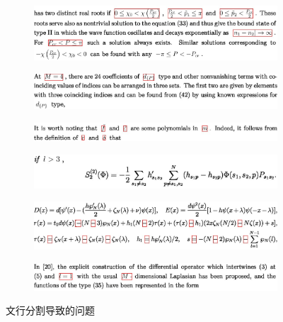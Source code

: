 \begin{figure}[hp]
    \centering
    \begin{subfigure}[b]{\linewidth}
    \centering
    \includegraphics[scale=0.3]{eps/a11.eps}
    \caption{\label{fig:fig1}}
    \end{subfigure}

    \begin{subfigure}[b]{\linewidth}
    \centering
    \includegraphics[scale=0.3]{eps/a12.eps}
    \caption{\label{fig:fig2}}
    \end{subfigure}

    \begin{subfigure}[b]{\linewidth}
    \centering   
    \includegraphics[scale=0.3]{eps/a13.eps}
    \caption{\label{fig:fig3}}
    \end{subfigure}

    \begin{subfigure}[b]{\linewidth}
    \centering 
    \includegraphics[scale=0.3]{eps/a14.eps}
    \caption{\label{fig:fig4}}
    \end{subfigure}

    \begin{subfigure}[b]{\linewidth}
    \centering 
    \includegraphics[scale=0.3]{eps/a15.eps}
    \caption{\label{fig:fig5}}
    \end{subfigure}

    \begin{subfigure}[b]{\linewidth}
    \centering
    \includegraphics[scale=0.3]{eps/a24.eps}
    \caption{\label{fig:fig6}}
    \end{subfigure}

    \caption{文行分割导致的问题}
    \label{fig:label}
\end{figure}

